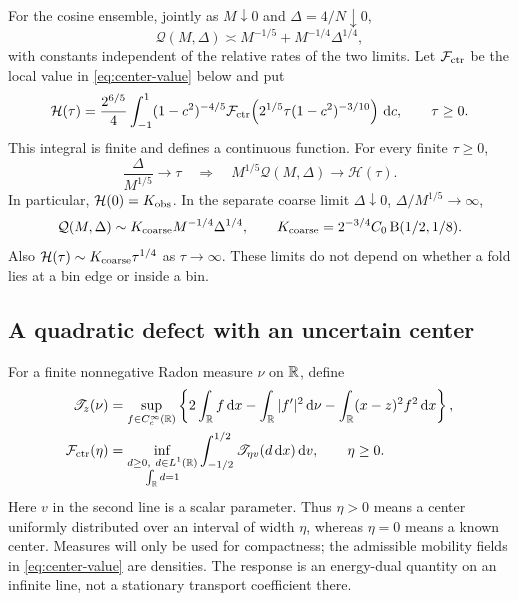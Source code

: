 \begin{theorem}
\label{thm:precision}
For the cosine ensemble, jointly as $M\downarrow0$ and
$\Delta=4/N\downarrow0$,
\begin{equation}\label{eq:precision-order}
 \mathcal Q(M,\Delta)\asymp
       M^{-1/5}+M^{-1/4}\Delta^{1/4},
\end{equation}
with constants independent of the relative rates of the two limits.
Let $\mathcal F_{\rm ctr}$ be the local value in
\eqref{eq:center-value} below and put
\begin{equation}\label{eq:crossover-function}
 \mathcal H(\tau)=\frac{2^{6/5}}4\int_{-1}^1
  (1-c^2)^{-4/5}
  \mathcal F_{\rm ctr}\!\left(2^{1/5}\tau(1-c^2)^{-3/10}\right)\,\mathrm d c,
       \qquad \tau\ge0.
\end{equation}
This integral is finite and defines a continuous function. For
every finite $\tau\ge0$,
\begin{equation}\label{eq:precision-crossover}
 \frac{\Delta}{M^{1/5}}\longrightarrow\tau
 \quad\Longrightarrow\quad
 M^{1/5}\mathcal Q(M,\Delta)\longrightarrow\mathcal H(\tau).
\end{equation}
In particular, $\mathcal H(0)=K_{\rm obs}$. In the separate coarse
limit $\Delta\downarrow0$, $\Delta/M^{1/5}\to\infty$,
\begin{equation}\label{eq:precision-coarse}
 \mathcal Q(M,\Delta)\sim
 K_{\rm coarse}M^{-1/4}\Delta^{1/4},\qquad
 K_{\rm coarse}=2^{-3/4}C_0\operatorname{B}(1/2,1/8).
\end{equation}
Also $\mathcal H(\tau)\sim K_{\rm coarse}\tau^{1/4}$ as
$\tau\to\infty$. These limits do not depend on whether a fold lies
at a bin edge or inside a bin.
\end{theorem}

\subsection{A quadratic defect with an uncertain center}
For a finite nonnegative Radon measure $\nu$ on $\mathbb R$, define
\begin{align}
 \mathscr T_z(\nu)&=\sup_{f\in C_c^\infty(\mathbb R)}
   \left\{2\int_\mathbb R f\,\mathrm d x-\int_\mathbb R |f'|^2\,\mathrm d\nu
                         -\int_\mathbb R(x-z)^2f^2\,\mathrm d x\right\},
                                          \label{eq:center-response}\\
 \mathcal F_{\rm ctr}(\eta)&=
   \inf_{\substack{d\ge0,\ d\in L^1(\mathbb R)\\\int_\mathbb R d=1}}
       \int_{-1/2}^{1/2}\mathscr T_{\eta v}(d\,\mathrm d x)\,\mathrm d v,
                        \qquad \eta\ge0. \label{eq:center-value}
\end{align}
Here $v$ in the second line is a scalar parameter. Thus $\eta>0$
means a center uniformly
distributed over an interval of width $\eta$, whereas $\eta=0$
means a known center. Measures will only be used for compactness;
the admissible mobility fields in \eqref{eq:center-value} are
densities. The response is an energy-dual quantity on an infinite
line, not a stationary transport coefficient there.

